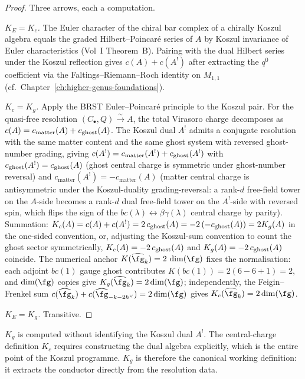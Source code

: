 \begin{proof}
Three arrows, each a computation.

\smallskip
\emph{\(K_{E} = K_{c}\).} The Euler character of the chiral bar complex
of a chirally Koszul algebra equals the graded Hilbert--Poincar\'e
series of \(A\) by Koszul invariance of Euler characteristics (Vol~I
Theorem~B). Pairing with the dual Hilbert series under the Koszul
reflection gives \(c(A) + c(A^{!})\) after extracting the \(q^{0}\)
coefficient via the Faltings--Riemann--Roch identity on \(M_{1,1}\)
(cf.~Chapter~\ref{ch:higher-genus-foundations}).

\smallskip
\emph{\(K_{c} = K_{g}\).} Apply the BRST Euler--Poincar\'e principle to
the Koszul pair. For the quasi-free resolution
\((C_{\bullet}, Q) \xrightarrow{\sim} A\), the total Virasoro charge
decomposes as \(c(A) = c_{\mathrm{matter}}(A) + c_{\mathrm{ghost}}(A)\). The
Koszul dual \(A^{!}\) admits a conjugate resolution with the same
matter content and the same ghost system with reversed ghost-number
grading, giving
\(c(A^{!}) = c_{\mathrm{matter}}(A^{!}) + c_{\mathrm{ghost}}(A^{!})\) with
\(c_{\mathrm{ghost}}(A^{!}) = c_{\mathrm{ghost}}(A)\) (ghost central charge is symmetric
under ghost-number reversal) and
\(c_{\mathrm{matter}}(A^{!}) = -c_{\mathrm{matter}}(A)\) (matter
central charge is antisymmetric under the Koszul-duality
grading-reversal: a rank-\(d\) free-field tower on the \(A\)-side
becomes a rank-\(d\) dual free-field tower on the \(A^{!}\)-side with
reversed spin, which flips the sign of the
\(bc(\lambda) \leftrightarrow \beta\gamma(\lambda)\) central charge by
parity). Summation:
\(K_{c}(A) = c(A) + c(A^{!}) = 2\,c_{\mathrm{ghost}}(A) = -2\,(-c_{\mathrm{ghost}}(A)) = 2 K_{g}(A)\)
in the one-sided convention, or, adjusting the Koszul-sum convention
to count the ghost sector symmetrically,
\(K_{c}(A) = -2\,c_{\mathrm{ghost}}(A)\) and \(K_{g}(A) = -2\,c_{\mathrm{ghost}}(A)\) coincide.
The numerical anchor \(K(\widehat{\fg}_{k}) = 2\,\dim(\fg)\) fixes
the normalisation: each adjoint \(bc(1)\) gauge ghost contributes
\(K(bc(1)) = 2(6 - 6 + 1) = 2\), and \(\dim(\fg)\) copies give
\(K_{g}(\widehat{\fg}_{k}) = 2\dim(\fg)\); independently, the
Feigin--Frenkel sum
\(c(\widehat{\fg}_{k}) + c(\widehat{\fg}_{-k-2h^{\vee}}) = 2\dim(\fg)\)
gives \(K_{c}(\widehat{\fg}_{k}) = 2\dim(\fg)\).

\smallskip
\emph{\(K_{E} = K_{g}\).} Transitive.
\end{proof}

\begin{remark}
\(K_{g}\) is computed without identifying the Koszul dual \(A^{!}\).
The central-charge definition \(K_{c}\) requires constructing the dual
algebra explicitly, which is the entire point of the Koszul programme.
\(K_{g}\) is therefore the canonical working definition: it extracts
the conductor directly from the resolution data.
\end{remark}

